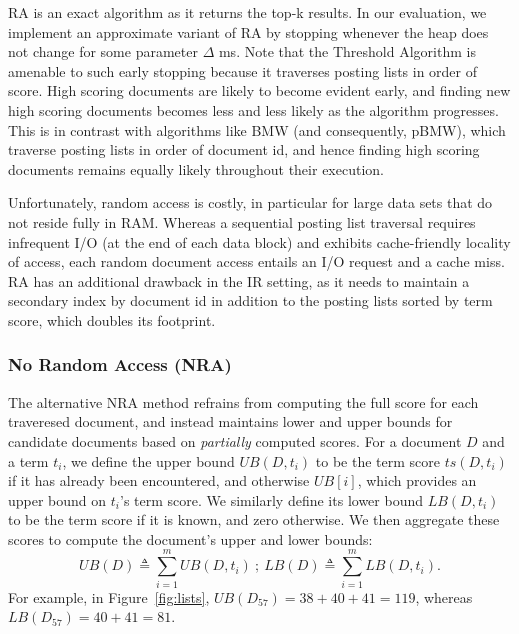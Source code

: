 RA is an exact  algorithm as it returns the top-k results. In our evaluation, we implement an approximate variant of RA by stopping whenever the heap does not change for some parameter $\Delta$ ms. 
Note that the Threshold Algorithm is amenable to such early stopping because it traverses posting lists in order of score. High scoring documents are likely to become evident early, and finding new high scoring documents becomes less and less likely as the algorithm progresses. This is in contrast with algorithms like BMW (and consequently, pBMW), which traverse posting lists in order of document id, and hence finding high scoring documents remains equally likely throughout their execution.

Unfortunately, random access is costly,  in particular for large data sets that do not reside fully in RAM.
Whereas a sequential posting list traversal requires infrequent I/O (at the end of each data block) and exhibits cache-friendly locality of access,  each random document access entails an I/O request and a cache miss.  
RA has an additional drawback in the IR setting, as it needs to maintain a secondary index by document id in addition to the posting lists sorted by term score, which doubles its footprint. 

\subsubsection{No Random Access (NRA)} 
The alternative NRA method %
refrains from computing the full score for each traveresed document, and instead
maintains lower and upper bounds for candidate documents based on {\em partially\/} computed scores. 
For a document $D$ and a term $t_i$, we define the upper bound $UB(D, t_i)$ to be the term score $ts(D, t_i)$ if it has already been encountered, and otherwise $UB[i]$, which provides an upper bound on $t_i$'s term score. We similarly define its lower bound $LB(D, t_i)$ to be the term score if it is known, and zero otherwise. We then aggregate these scores to compute the document's upper and lower bounds:
\[
UB(D) \triangleq \sum_{i=1}^m UB(D, t_i) \ ; \  
LB(D) \triangleq \sum_{i=1}^m LB(D, t_i).
\] 
For example, in Figure~\ref{fig:lists}, $UB(D_{57}) = 38+40+41 = 119$, whereas $LB(D_{57}) = 40+41 = 81$.

